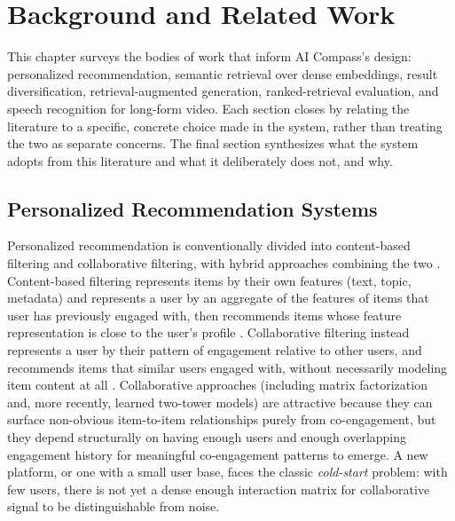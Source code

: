 \chapter{Background and Related Work}
\label{ch:background}

This chapter surveys the bodies of work that inform AI Compass's design: personalized recommendation, semantic retrieval over dense embeddings, result diversification, retrieval-augmented generation, ranked-retrieval evaluation, and speech recognition for long-form video. Each section closes by relating the literature to a specific, concrete choice made in the system, rather than treating the two as separate concerns. The final section synthesizes what the system adopts from this literature and what it deliberately does not, and why.

\section{Personalized Recommendation Systems}
\label{sec:background-recsys}

Personalized recommendation is conventionally divided into content-based filtering and collaborative filtering, with hybrid approaches combining the two \cite{ricci2015recommender}. Content-based filtering represents items by their own features (text, topic, metadata) and represents a user by an aggregate of the features of items that user has previously engaged with, then recommends items whose feature representation is close to the user's profile \cite{pazzani2007content}. Collaborative filtering instead represents a user by their pattern of engagement relative to other users, and recommends items that similar users engaged with, without necessarily modeling item content at all \cite{su2009collaborative}. Collaborative approaches (including matrix factorization and, more recently, learned two-tower models) are attractive because they can surface non-obvious item-to-item relationships purely from co-engagement, but they depend structurally on having enough users and enough overlapping engagement history for meaningful co-engagement patterns to emerge. A new platform, or one with a small user base, faces the classic \emph{cold-start} problem: with few users, there is not yet a dense enough interaction matrix for collaborative signal to be distinguishable from noise.

